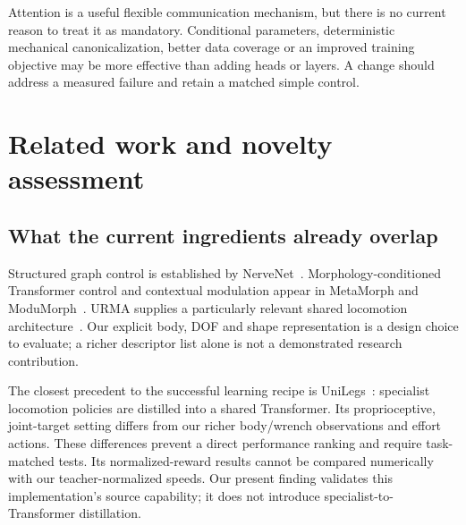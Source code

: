 \documentclass[11pt,letterpaper]{article}
\begin{document}
Attention is a useful flexible communication mechanism, but there is no current
reason to treat it as mandatory. Conditional parameters, deterministic mechanical
canonicalization, better data coverage or an improved training objective may be
more effective than adding heads or layers. A change should address a measured
failure and retain a matched simple control.

\section{Related work and novelty assessment}
\label{sec:novelty}

\subsection{What the current ingredients already overlap}
Structured graph control is established by NerveNet~\cite{nervenet}.
Morphology-conditioned Transformer control and contextual modulation appear in
MetaMorph and ModuMorph~\cite{metamorph,modumorph}. URMA supplies a particularly
relevant shared locomotion architecture~\cite{urma}. Our explicit body, DOF and
shape representation is a design choice to evaluate; a richer descriptor list
alone is not a demonstrated research contribution.

The closest precedent to the successful learning recipe is
UniLegs~\cite{unilegs}: specialist locomotion policies are distilled into a shared
Transformer. Its proprioceptive, joint-target setting differs from our richer
body/wrench observations and effort actions. These differences prevent a direct
performance ranking and require task-matched tests. Its normalized-reward results
cannot be compared numerically with our teacher-normalized speeds. Our present
finding validates this implementation's source capability; it does not introduce
specialist-to-Transformer distillation.
\end{document}
